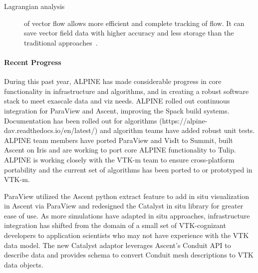 \begin{description}
	\item [Lagrangian analysis] of vector flow allows more efficient and complete tracking of flow.  It can save vector field data with higher accuracy and less storage than the traditional approaches~\cite{alpine:Sane:EGPGV18,alpine:Sane:EGPGV19,alpine:Binyahib:LDAV19}.
\end{description}


\paragraph{Recent Progress}

During this past year, ALPINE has made considerable progress in core functionality in infrastructure and algorithms, and in creating a robust software stack to meet exascale data and viz needs.  ALPINE rolled out continuous integration for ParaView and Ascent, improving the Spack build systems.  Documentation has been rolled out for algorithms (https://alpine-dav.readthedocs.io/en/latest/) and algorithm teams have added robust unit tests.  ALPINE team members have ported ParaView and VisIt to Summit, built Ascent on Iris and are working to port core ALPINE functionality to Tulip.  ALPINE is working closely with the VTK-m team to ensure cross-platform portability and the current set of algorithms has been ported to or prototyped in VTK-m.   

ParaView utilized the Ascent python extract feature to add in situ visualization in Ascent via ParaView and redesigned the Catalyst in situ library for greater ease of use.  As more simulations have adapted in situ approaches, infrastructure integration has shifted from the domain of a small set of VTK-cognizant developers to application scientists who may not have experience with the VTK data model.  
The new Catalyst adaptor leverages Ascent's Conduit API to describe data and provides schema to convert Conduit mesh descriptions to VTK data objects.  

